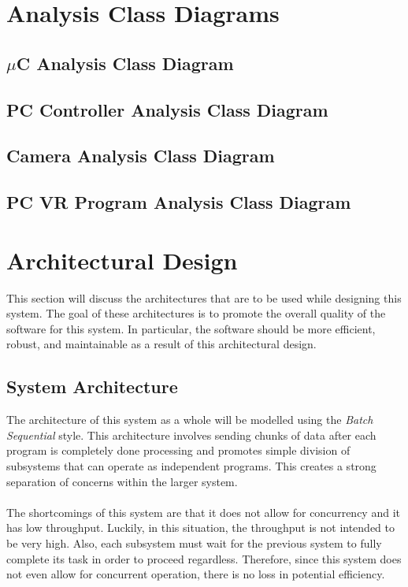 \documentclass[titlepage]{article}
\begin{document}
\section{Analysis Class Diagrams}
\subsection{$\mu$C Analysis Class Diagram}
\subsection{PC Controller Analysis Class Diagram}
\subsection{Camera Analysis Class Diagram}
\subsection{PC VR Program Analysis Class Diagram}



\section{Architectural Design}
This section will discuss the architectures that are to be used while designing this system. The goal of these architectures is to promote the overall quality of the software for this system. In particular, the software should be more efficient, robust, and maintainable as a result of this architectural design.
\subsection{System Architecture}
The architecture of this system as a whole will be modelled using the \textit{Batch Sequential} style. This architecture involves sending chunks of data after each program is completely done processing and promotes simple division of subsystems that can operate as independent programs. This creates a strong separation of concerns within the larger system.\\~\\
The shortcomings of this system are that it does not allow for concurrency and it has low throughput. Luckily, in this situation, the throughput is not intended to be very high. Also, each subsystem must wait for the previous system to fully complete its task in order to proceed regardless. Therefore, since this system does not even allow for concurrent operation, there is no loss in potential efficiency.
\end{document}
